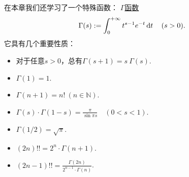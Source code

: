 在本章我们还学习了一个特殊函数：
\hyperref[equation:特殊函数.伽马函数的积分定义]{\(\Gamma\)函数}\[
	\Gamma(s)
	:=
	\int_0^{+\infty} t^{s-1} e^{-t} \dd{t}
	\quad(s>0).
\]
它具有几个重要性质：\begin{itemize}
	\item 对于任意\(s > 0\)，总有\(\Gamma(s+1) = s~\Gamma(s)\).
	\item \(\Gamma(1) = 1\).
	\item \(\Gamma(n+1) = n!\ (n\in\mathbb{N})\).
	\item \(\Gamma(s) \cdot \Gamma(1-s) = \frac{\pi}{\sin{\pi s}} \quad (0 < s < 1)\).
	\item \(\Gamma\left(1/2\right) = \sqrt{\pi}\).
	\item \((2n)!! = 2^n \cdot \Gamma(n+1)\).
	\item \((2n-1)!! = \frac{\Gamma(2n)}{2^{n-1} \cdot \Gamma(n)}\).
\end{itemize}
